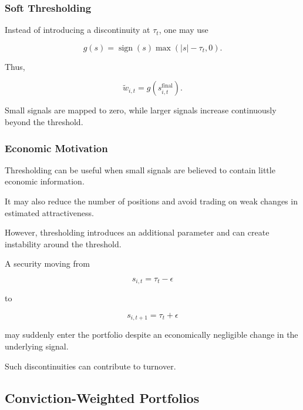 \documentclass[11pt,a4paper]{article}
\begin{document}
\subsubsection{Soft Thresholding}

Instead of introducing a discontinuity at $\tau_t$, one may use

\begin{equation}
\boxed{
g(s)
=
\operatorname{sign}(s)
\max
\left(
|s|-\tau_t,
0
\right).
}
\end{equation}

Thus,

\begin{equation}
\widetilde{w}_{i,t}
=
g
\left(
s_{i,t}^{\mathrm{final}}
\right).
\end{equation}

Small signals are mapped to zero, while larger signals increase continuously
beyond the threshold.


\subsubsection{Economic Motivation}

Thresholding can be useful when small signals are believed to contain little
economic information.

It may also reduce the number of positions and avoid trading on weak changes in
estimated attractiveness.

However, thresholding introduces an additional parameter and can create
instability around the threshold.

A security moving from

\begin{equation}
s_{i,t}
=
\tau_t-\epsilon
\end{equation}

to

\begin{equation}
s_{i,t+1}
=
\tau_t+\epsilon
\end{equation}

may suddenly enter the portfolio despite an economically negligible change in
the underlying signal.

Such discontinuities can contribute to turnover.


\subsection{Conviction-Weighted Portfolios}
\label{subsec:conviction_weighted_portfolios}
\end{document}
